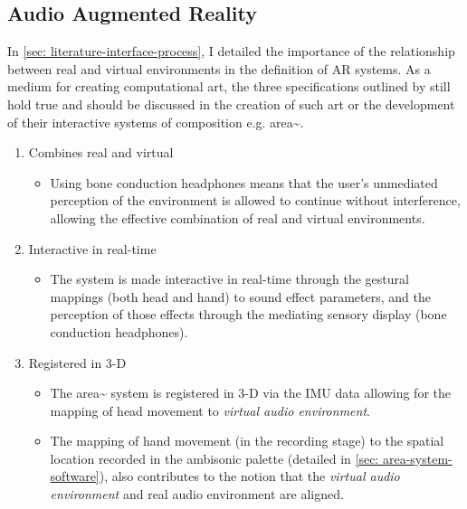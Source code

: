 \subsection{Audio Augmented Reality}            \label{sec: area-discussion-aar}
In \autoref{sec: literature-interface-process}, I detailed the importance of the relationship between real and virtual environments in the definition of AR systems. As a medium for creating computational art, the three specifications outlined by \citep{azuma1997} still hold true and should be discussed in the creation of such art or the development of their interactive systems of composition e.g. area\textasciitilde{}.
\begin{enumerate}
    \item Combines real and virtual
        \begin{itemize}
            \item Using bone conduction headphones means that the user’s unmediated perception of the environment is allowed to continue without interference, allowing the effective combination of real and virtual environments.
        \end{itemize}
    \item Interactive in real-time
        \begin{itemize}
            \item The system is made interactive in real-time through the gestural mappings (both head and hand) to sound effect parameters, and the perception of those effects through the mediating sensory display (bone conduction headphones).
        \end{itemize}
    \item Registered in 3-D
        \begin{itemize}
            \item The area\textasciitilde{} system is registered in 3-D via the IMU data allowing for the mapping of head movement to \textit{virtual audio environment}. 
            \item The mapping of hand movement (in the recording stage) to the spatial location recorded in the ambisonic palette (detailed in \autoref{sec: area-system-software}), also contributes to the notion that the \textit{virtual audio environment} and real audio environment are aligned.
        \end{itemize}
\end{enumerate}

